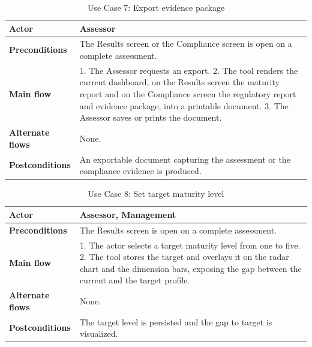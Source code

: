 \begin{table}[H]
\centering
\caption{Use Case 7: Export evidence package} \label{tab:uc07}
\begin{tabular}{|p{3cm}|p{12cm}|}
\hline
\textbf{Actor} & Assessor \\
\hline
\textbf{Preconditions} & The Results screen or the Compliance screen is open on a complete assessment. \\
\hline
\textbf{Main flow} & 1. The Assessor requests an export. 2. The tool renders the current dashboard, on the Results screen the maturity report and on the Compliance screen the regulatory report and evidence package, into a printable document. 3. The Assessor saves or prints the document. \\
\hline
\textbf{Alternate flows} & None. \\
\hline
\textbf{Postconditions} & An exportable document capturing the assessment or the compliance evidence is produced. \\
\hline
\end{tabular}

\end{table}

\begin{table}[H]
\centering
\caption{Use Case 8: Set target maturity level} \label{tab:uc08}
\begin{tabular}{|p{3cm}|p{12cm}|}
\hline
\textbf{Actor} & Assessor, Management \\
\hline
\textbf{Preconditions} & The Results screen is open on a complete assessment. \\
\hline
\textbf{Main flow} & 1. The actor selects a target maturity level from one to five. 2. The tool stores the target and overlays it on the radar chart and the dimension bars, exposing the gap between the current and the target profile. \\
\hline
\textbf{Alternate flows} & None. \\
\hline
\textbf{Postconditions} & The target level is persisted and the gap to target is visualized. \\
\hline
\end{tabular}

\end{table}

